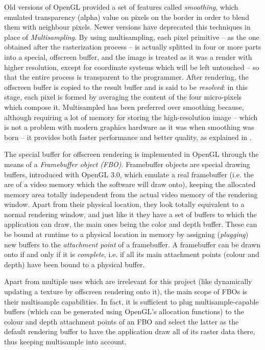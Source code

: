 Old versions of OpenGL provided a set of features called \emph{smoothing}, which
emulated transparency (alpha) value on pixels on the border in order to blend
them with neighbour pixels. Newer versions have deprecated this techniques in
place of \emph{Multisampling}. By using multisampling, each pixel primitive --
as the one obtained after the rasterization process -- is actually splitted in
four or more parts into a special, offscreen buffer, and the image is treated as
it was a render with higher resolution, except for coordinate systems which will
be left untouched -- so that the entire process is transparent to the
programmer. After rendering, the offscreen buffer is copied to the result buffer
and is said to be \emph{resolved}: in this stage, each pixel is formed by
averaging the content of the four micro-pixels which compose it. Multisampled
has been preferred over smoothing because, although requiring a lot of memory
for storing the high-resolution image -- which is not a problem with modern
graphics hardware as it was when smoothing was born --  it provides both faster
performance and better quality, as explained in \cite{opengl-book}.

The special buffer for offscreen rendering is implemented in OpenGL through the
means of a \emph{Framebuffer object (\emph{FBO})}.
Framebuffer objects are special drawing buffers, introduced with OpenGL 3.0,
which emulate a real framebuffer (i.e. the are of a video memory which
the software will draw onto), keeping the allocated memory area totally
independent from the actual video memory of the rendering window. Apart from
their physical location, they look totally equivalent to a normal rendering
window, and just like it they have a set of buffers to which the application can
draw, the main ones being the color and depth buffer. These can be bound 
at runtime to a physical location in memory by assigning (\emph{plugging}) new buffers to the \emph{attachment point} of a
framebuffer. A framebuffer can be drawn onto if and only if it is
\emph{complete}, i.e. if all its main attachment points (colour and depth) have
been bound to a physical buffer.

Apart from multiple uses which are irrelevant for this project (like dynamically
updating a texture by offscreen rendering onto it), the main scope of FBOs is
their multisample capabilities. In fact, it is sufficient to plug
multisample-capable buffers (which can be generated using OpenGL's allocation
functions) to the colour and depth attachment points of an FBO and select the
latter as the default rendering buffer to have the application draw all of its
raster data there, thus keeping multisample into account. 

